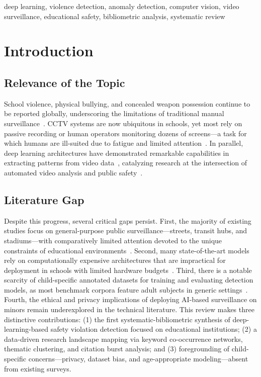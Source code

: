 \documentclass[conference]{IEEEtran}
\begin{document}
\begin{IEEEkeywords}
deep learning, violence detection, anomaly detection, computer vision, video surveillance, educational safety, bibliometric analysis, systematic review
\end{IEEEkeywords}

\section{Introduction}

\subsection{Relevance of the Topic}

School violence, physical bullying, and concealed weapon possession continue to be reported globally, underscoring the limitations of traditional manual surveillance~\cite{b1,b2}. CCTV systems are now ubiquitous in schools, yet most rely on passive recording or human operators monitoring dozens of screens---a task for which humans are ill-suited due to fatigue and limited attention~\cite{b3,b4,b26}. In parallel, deep learning architectures have demonstrated remarkable capabilities in extracting patterns from video data~\cite{b5,b6,b7}, catalyzing research at the intersection of automated video analysis and public safety~\cite{b8,b9,b10}.

\subsection{Literature Gap}

Despite this progress, several critical gaps persist. First, the majority of existing studies focus on general-purpose public surveillance---streets, transit hubs, and stadiums---with comparatively limited attention devoted to the unique constraints of educational environments~\cite{b11,b12}. Second, many state-of-the-art models rely on computationally expensive architectures that are impractical for deployment in schools with limited hardware budgets~\cite{b13,b14}. Third, there is a notable scarcity of child-specific annotated datasets for training and evaluating detection models, as most benchmark corpora feature adult subjects in generic settings~\cite{b15,b16}. Fourth, the ethical and privacy implications of deploying AI-based surveillance on minors remain underexplored in the technical literature. This review makes three distinctive contributions: (1) the first systematic-bibliometric synthesis of deep-learning-based safety violation detection focused on educational institutions; (2) a data-driven research landscape mapping via keyword co-occurrence networks, thematic clustering, and citation burst analysis; and (3) foregrounding of child-specific concerns---privacy, dataset bias, and age-appropriate modeling---absent from existing surveys.
\end{document}
